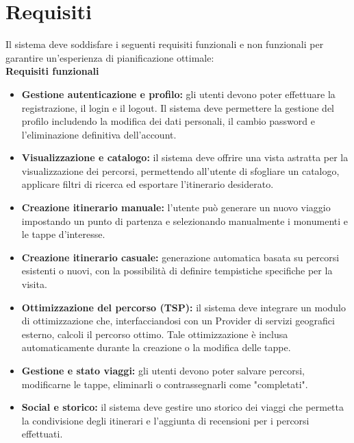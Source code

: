 \section{Requisiti}
Il sistema deve soddisfare i seguenti requisiti funzionali e non funzionali per garantire un'esperienza di pianificazione ottimale:\vspace{9px}\\
\textbf{Requisiti funzionali}
\begin{itemize}
    \item \textbf{Gestione autenticazione e profilo:} gli utenti devono poter effettuare la registrazione, il login e il logout. Il sistema deve permettere la gestione del profilo includendo la modifica dei dati personali, il cambio password e l'eliminazione definitiva dell'account.
    \item \textbf{Visualizzazione e catalogo:} il sistema deve offrire una vista astratta per la visualizzazione dei percorsi, permettendo all'utente di sfogliare un catalogo, applicare filtri di ricerca ed esportare l'itinerario desiderato.
    \item \textbf{Creazione itinerario manuale:} l'utente può generare un nuovo viaggio impostando un punto di partenza e selezionando manualmente i monumenti e le tappe d'interesse.
    \item \textbf{Creazione itinerario casuale:} generazione automatica basata su percorsi esistenti o nuovi, con la possibilità di definire tempistiche specifiche per la visita.
    \item \textbf{Ottimizzazione del percorso (TSP):} il sistema deve integrare un modulo di ottimizzazione che, interfacciandosi con un Provider di servizi geografici esterno, calcoli il percorso ottimo. Tale ottimizzazione è inclusa automaticamente durante la creazione o la modifica delle tappe.
    \item \textbf{Gestione e stato viaggi:} gli utenti devono poter salvare percorsi, modificarne le tappe, eliminarli o contrassegnarli come "completati".
    \item \textbf{Social e storico:} il sistema deve gestire uno storico dei viaggi che permetta la condivisione degli itinerari e l'aggiunta di recensioni per i percorsi effettuati.
\end{itemize}

